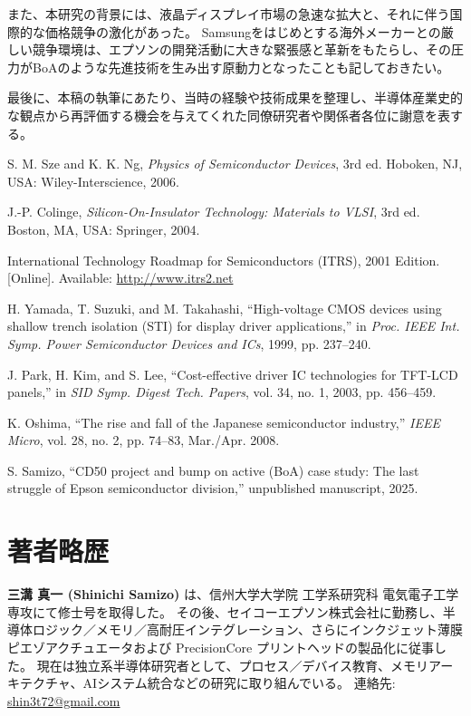 \documentclass[conference]{IEEEtran}
\begin{document}
また、本研究の背景には、液晶ディスプレイ市場の急速な拡大と、それに伴う国際的な価格競争の激化があった。  
Samsungをはじめとする海外メーカーとの厳しい競争環境は、エプソンの開発活動に大きな緊張感と革新をもたらし、その圧力がBoAのような先進技術を生み出す原動力となったことも記しておきたい。  

最後に、本稿の執筆にあたり、当時の経験や技術成果を整理し、半導体産業史的な観点から再評価する機会を与えてくれた同僚研究者や関係者各位に謝意を表する。

\begin{thebibliography}{99}

S. M. Sze and K. K. Ng, \textit{Physics of Semiconductor Devices}, 3rd ed. Hoboken, NJ, USA: Wiley-Interscience, 2006.

J.-P. Colinge, \textit{Silicon-On-Insulator Technology: Materials to VLSI}, 3rd ed. Boston, MA, USA: Springer, 2004.

International Technology Roadmap for Semiconductors (ITRS), 2001 Edition. [Online]. Available: \url{http://www.itrs2.net}

H. Yamada, T. Suzuki, and M. Takahashi, ``High-voltage CMOS devices using shallow trench isolation (STI) for display driver applications,'' in \textit{Proc. IEEE Int. Symp. Power Semiconductor Devices and ICs}, 1999, pp. 237--240.

J. Park, H. Kim, and S. Lee, ``Cost-effective driver IC technologies for TFT-LCD panels,'' in \textit{SID Symp. Digest Tech. Papers}, vol. 34, no. 1, 2003, pp. 456--459.

K. Oshima, ``The rise and fall of the Japanese semiconductor industry,'' \textit{IEEE Micro}, vol. 28, no. 2, pp. 74--83, Mar./Apr. 2008.

S. Samizo, ``CD50 project and bump on active (BoA) case study: The last struggle of Epson semiconductor division,'' unpublished manuscript, 2025.

\end{thebibliography}

\section*{著者略歴}
\textbf{三溝 真一 (Shinichi Samizo)} は、信州大学大学院 工学系研究科 電気電子工学専攻にて修士号を取得した。  
その後、セイコーエプソン株式会社に勤務し、半導体ロジック／メモリ／高耐圧インテグレーション、さらにインクジェット薄膜ピエゾアクチュエータおよび PrecisionCore プリントヘッドの製品化に従事した。  
現在は独立系半導体研究者として、プロセス／デバイス教育、メモリアーキテクチャ、AIシステム統合などの研究に取り組んでいる。  
連絡先: \href{mailto:shin3t72@gmail.com}{shin3t72@gmail.com}
\end{document}
